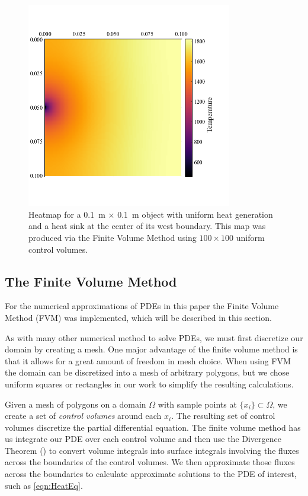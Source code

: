 \begin{figure}
	\centering
	\includegraphics[width=0.8\textwidth]{Chapter_I_Background/Images/Heatmap_Example.png}
	\caption[Heatmap Example]{Heatmap for a \SI{0.1}{\meter} $\times$ \SI{0.1}{\meter} object with uniform heat generation and a heat sink at the center of its west boundary. This map was produced via the Finite Volume Method using $100\times 100$ uniform control volumes.}
	\label{fig:heatmap-example}
\end{figure}

\subsection{The Finite Volume Method}\label{sec:FVM}

For the numerical approximations of PDEs in this paper the Finite Volume Method (FVM) was implemented, which will be described in this section.

As with many other numerical method to solve PDEs, we must first discretize our domain by creating a mesh. One major advantage of the finite volume method is that it allows for a great amount of freedom in mesh choice. When using FVM the domain can be discretized into a mesh of arbitrary polygons, but we chose uniform squares or rectangles in our work to simplify the resulting calculations.

Given a mesh of polygons on a domain $\Omega$ with sample points at $\lbrace x_i\rbrace\subset\Omega$, we create a set of \textit{control volumes} around each $x_i$. The resulting set of control volumes discretize the partial differential equation. The finite volume method has us integrate our PDE over each control volume and then use the Divergence Theorem () to convert volume integrals into surface integrals involving the fluxes across the boundaries of the control volumes. We then approximate those fluxes across the boundaries to calculate approximate solutions to the PDE of interest, such as \eqref{eqn:HeatEq}.


